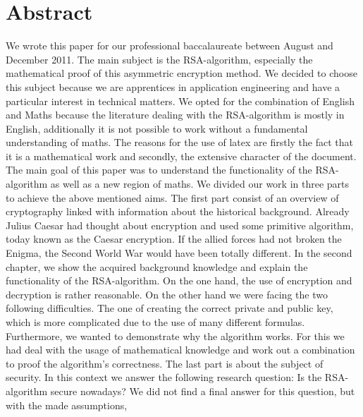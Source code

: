 \section{Abstract}
We wrote this paper for our professional baccalaureate between August and December 2011. The main subject is the RSA-algorithm, especially the mathematical proof of this asymmetric encryption method. We decided to choose this subject because we are apprentices in application engineering and have a particular interest in technical matters. We opted for the combination of English and Maths because the literature dealing with the RSA-algorithm is mostly in English, additionally it is not possible to work without a fundamental understanding of maths. The reasons for the use of latex are firstly the fact that it is a mathematical work and secondly, the extensive character of the document. %
The main goal of this paper was to understand the functionality of the RSA-algorithm as well as a new region of maths. We divided our work in three parts to achieve the above mentioned aims. The first part consist of an overview of cryptography linked with information about the historical background. Already Julius Caesar had thought about encryption and used some primitive algorithm, today known as the Caesar encryption. If the allied forces had not broken the Enigma, the Second World War would have been totally different. %
In the second chapter, we show the acquired background knowledge and explain the functionality of the RSA-algorithm. 
On the one hand, the use of encryption and decryption is rather reasonable. On the other hand we were facing the two following difficulties. The one of creating the correct private and public key, which is more complicated due to the use of many different formulas. Furthermore, we wanted to demonstrate why the algorithm works. For this we had deal with the usage of mathematical knowledge and work out a combination to proof the algorithm's correctness. 
The last part is about the subject of security. In this context we answer the following research question: Is the RSA-algorithm secure nowadays? We did not find a final answer for this question, but with the made assumptions, %
